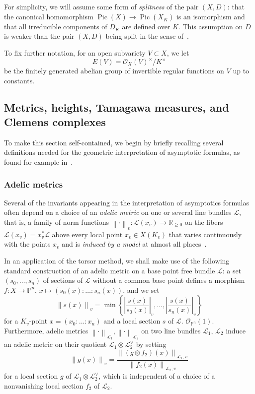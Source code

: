 \documentclass[a4paper, twoside, 10pt]{amsart}
\newcommand{\cL}{\mathcal{L}}
\newcommand{\cO}{\mathcal{O}}
\newcommand{\PP}{\mathbb{P}}
\newcommand{\RR}{\mathbb{R}}
\newcommand{\Kbar}{{\overline{K}}}
\DeclareMathOperator{\Pic}{Pic}
\newcommand{\abs}[1]{\left\lvert#1\right\rvert}
\newcommand{\norm}[1]{\left\lVert#1\right\rVert}
\theoremstyle{definition}
\begin{document}
For simplicity, we will assume some form of \emph{splitness} of the pair $(X,D)$: that the canonical homomorphism $\Pic(X)\to\Pic(X_\Kbar)$ is an isomorphism and that all irreducible components of $D_\Kbar$ are defined over $K$. This assumption on $D$ is weaker than the pair $(X,D)$ being split in the sense of~\cite{MR3732687}.

To fix further notation, for an open subvariety $V\subset X$, we let
\[
  E(V)=\cO_X(V)^\times/K^\times
\]
be the finitely generated abelian group of invertible regular functions on $V$ up to constants.


\subsection{Metrics, heights, Tamagawa measures, and Clemens complexes}\label{ssec:metrics-heights-tamagawa}

To make this section self-contained, we begin by briefly recalling several definitions needed for the geometric interpretation of asymptotic formulas, as found for example in~\cite{MR2019019,MR2740045}.

\subsubsection{Adelic metrics}
Several of the invariants appearing in the interpretation of asymptotics formulas often depend on a choice of an \emph{adelic metric} on one or several line bundles $\cL$, that is, a family of norm functions
$\norm{\cdot}_v\colon \cL(x_v) \to \RR_{\geq 0}$
on the fibers $\cL(x_v) = x_v^* \cL$ above every local point $x_v\in X(K_v)$ that varies continuously with the points $x_v$ and is \emph{induced by a model} at almost all places~\cite[Ex.~2.2, Déf.~2.3]{MR2019019}.

  In an application of the torsor method, we shall make use of the following standard construction of an adelic metric on a base point free bundle $\cL$:
  a set $(s_0,\dots,s_n)$ of sections of $\cL$ without a common base point defines a morphism
  $f\colon X \to \PP^n$, $x\mapsto (s_0(x):\dots:s_n(x))$, and we set
  \[
    \norm{s(x)}_v =
    \min \left\{
      \abs{\frac{s(x)}{s_0(x)}}_v,
      \dots,
      \abs{\frac{s(x)}{s_n(x)}}_v
    \right\} 
  \]
  for a $K_v$-point $x=(x_0:\dots:x_n)$ and a local section $s$ of $\cL$. $\cO_{\PP^n}(1)$.
  Furthermore, adelic metrics $\norm{\cdot}_{\cL_1}, \norm{\cdot}_{\cL_2}$ on
  two line bundles $\cL_1$, $\cL_2$ induce an adelic metric on their quotient 
  $\cL_1 \otimes \cL_2^\vee$ by setting
  \[
    \norm{g(x)}_{v}
    = \frac{\norm{(g\otimes f_2)(x)}_{\cL_1,v}}{\norm{f_2(x)}_{\cL_2,v}}
  \]
  for a local section $g$ of $\cL_1 \otimes \cL_2^\vee$, which is independent of 
  a choice of a nonvanishing local section $f_2$ of $\cL_2$.
\end{document}
